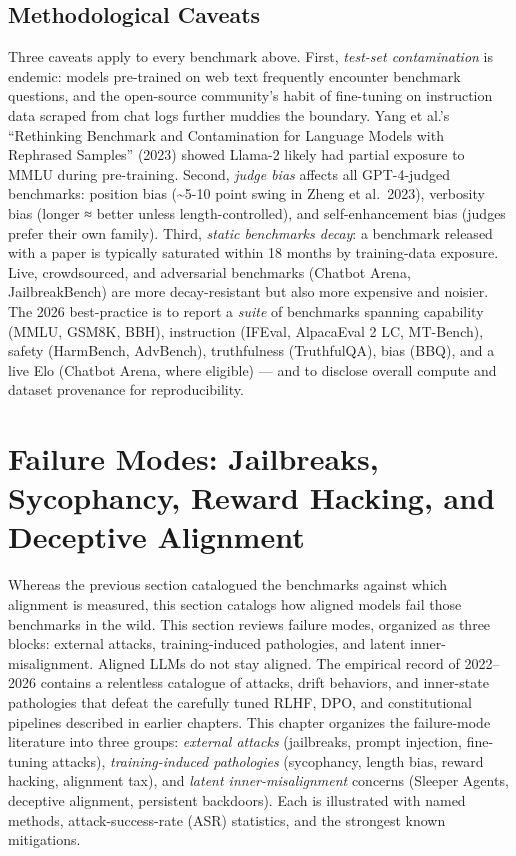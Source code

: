 \documentclass{article}
\begin{document}
\subsection{Methodological Caveats}\label{methodological-caveats}

Three caveats apply to every benchmark above. First, \emph{test-set contamination} is endemic: models pre-trained on web text frequently encounter benchmark questions, and the open-source community's habit of fine-tuning on instruction data scraped from chat logs further muddies the boundary. Yang et al.'s ``Rethinking Benchmark and Contamination for Language Models with Rephrased Samples'' (2023) showed Llama-2 likely had partial exposure to MMLU during pre-training. Second, \emph{judge bias} affects all GPT-4-judged benchmarks: position bias (\textasciitilde5-10 point swing in Zheng et al.~2023), verbosity bias (longer ≈ better unless length-controlled), and self-enhancement bias (judges prefer their own family). Third, \emph{static benchmarks decay}: a benchmark released with a paper is typically saturated within 18 months by training-data exposure. Live, crowdsourced, and adversarial benchmarks (Chatbot Arena, JailbreakBench) are more decay-resistant but also more expensive and noisier. The 2026 best-practice is to report a \emph{suite} of benchmarks spanning capability (MMLU, GSM8K, BBH), instruction (IFEval, AlpacaEval 2 LC, MT-Bench), safety (HarmBench, AdvBench), truthfulness (TruthfulQA), bias (BBQ), and a live Elo (Chatbot Arena, where eligible) --- and to disclose overall compute and dataset provenance for reproducibility.

\section{Failure Modes: Jailbreaks, Sycophancy, Reward Hacking, and Deceptive Alignment}\label{failure-modes-jailbreaks-sycophancy-reward-hacking-and-deceptive-alignment}

Whereas the previous section catalogued the benchmarks against which alignment is measured, this section catalogs how aligned models fail those benchmarks in the wild. This section reviews failure modes, organized as three blocks: external attacks, training-induced pathologies, and latent inner-misalignment. Aligned LLMs do not stay aligned. The empirical record of 2022--2026 contains a relentless catalogue of attacks, drift behaviors, and inner-state pathologies that defeat the carefully tuned RLHF, DPO, and constitutional pipelines described in earlier chapters. This chapter organizes the failure-mode literature into three groups: \emph{external attacks} (jailbreaks, prompt injection, fine-tuning attacks), \emph{training-induced pathologies} (sycophancy, length bias, reward hacking, alignment tax), and \emph{latent inner-misalignment} concerns (Sleeper Agents, deceptive alignment, persistent backdoors). Each is illustrated with named methods, attack-success-rate (ASR) statistics, and the strongest known mitigations.
\end{document}
